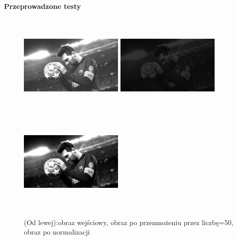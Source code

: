 \documentclass[magisterska,openany]{pracadypl}
\begin{document}
\newpage
\vspace{0.25cm}\textbf{\Large Przeprowadzone testy}
\vspace{0.5cm}
\begin{figure}[h]
\centering
\includegraphics[width=5cm, height=5cm]{orgi/gMessi.jpg}
\includegraphics[width=5cm, height=5cm]{3_3/multi_constG1.jpg}
\includegraphics[width=5cm, height=5cm]{3_3/nmulti_constG1.jpg}
\caption{(Od lewej):obraz wejściowy, obraz po przemnożeniu przez liczbę=50,
obraz po normalizacji}
\end{figure}
\end{document}
